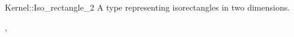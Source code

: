 \begin{ccRefConcept}{Kernel::Iso_rectangle_2}
A type representing isorectangles in two dimensions.

\ccRefines
{},

\ccSeeAlso
{}

\end{ccRefConcept}
